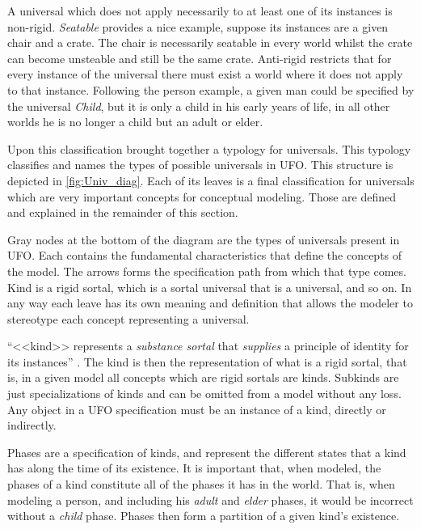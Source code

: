 A universal which does not apply necessarily to at least one of its instances is non-rigid. \textit{Seatable} provides a nice example, suppose its instances are a given chair and a crate. The chair is necessarily seatable in every world whilst the crate can become unsteable and still be the same crate. Anti-rigid restricts that for every instance of the universal there must exist a world where it does not apply to that instance. Following the person example, a given man could be specified by the universal \textit{Child}, but it is only a child in his early years of life, in all other worlds he is no longer a child but an adult or elder.

Upon this classification \citeauthor{guizzardi_ontological_2005} brought together a typology for universals. This typology classifies and names the types of possible universals in UFO. This structure is depicted in \autoref{fig:Univ_diag}. Each of its leaves is a final classification for universals which are very important concepts for conceptual modeling. Those are defined and explained in the remainder of this section.



Gray nodes at the bottom of the diagram are the types of universals present in UFO. Each contains the fundamental characteristics that define the concepts of the model. The arrows forms the specification path from which that type comes. Kind is a rigid sortal, which is a sortal universal that is a universal, and so on. In any way each leave has its own meaning and definition that allows the modeler to stereotype each concept representing a universal.

``<<kind>> represents a \textit{substance sortal} that \textit{supplies} a principle of identity for its instances'' \citep{guizzardi_ontological_2005}. The kind is then the representation of what is a rigid sortal, that is, in a given model all concepts which are rigid sortals are kinds. Subkinds are just specializations of kinds and can be omitted from a model without any loss. Any object in a UFO specification must be an instance of a kind, directly or indirectly.

Phases are a specification of kinds, and represent the different states that a kind has along the time of its existence. It is important that, when modeled, the phases of a kind constitute all of the phases it has in the world. That is, when modeling a person, and including his \textit{adult} and \textit{elder} phases, it would be incorrect without a \textit{child} phase. Phases then form a partition of a given kind's existence.

